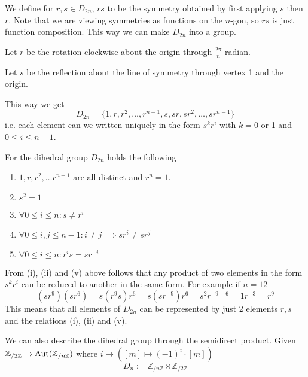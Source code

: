 \begin{center}
   
\end{center}

We define for \(r,s \in D_{2n}\), \(rs\) to be the symmetry obtained by first applying \(s\) then \(r\).
Note that we are viewing symmetries as functions on the \(n\)-gon, so \(rs\) is just function composition.
This way we can make \(D_{2n}\) into a group.

Let \(r\) be the rotation clockwise about the origin through \(\frac{2\pi}{n}\) radian.

Let \(s\) be the reflection about the line of symmetry through vertex 1 and the origin.

This way we get
\[D_{2n} = \{1, r, r^2, \ldots, r^{n-1}, s, sr, sr^2, \ldots, sr^{n-1}\}\]
i.e. each element can we written uniquely in the form \(s^kr^i\) with \(k = 0\) or 1 and \(0 \leq i \leq n-1\).
\begin{proposition}
   For the dihedral group \(D_{2n}\) holds the following
   \begin{enumerate}[label=\roman*, align=Center]
      \item \(1, r, r^2, \ldots r^{n-1}\) are all distinct and \(r^n = 1\).
      \item \(s^2 = 1\)
      \item \(\forall 0 \leq i \leq n: s \neq r^i\)
      \item \(\forall 0 \leq i,j \leq n-1: i \neq j \implies sr^i \neq sr^j\)
      \item \(\forall 0 \leq i \leq n: r^is = sr^{-i}\)
   \end{enumerate}
\end{proposition}
From (i), (ii) and (v) above follows that any product of two elements in the form \(s^kr^i\) can be reduced to another in the same form.
For example if \(n = 12\)
\[(sr^9)(sr^6) = s(r^9s)r^6 = s(sr^{-9})r^6 = s^2r^{-9+6} = 1 r^{-3} = r^9\]
This means that all elements of \(D_{2n}\) can be represented by just 2 elements \(r, s\) and the relations (i), (ii) and (v).

We can also describe the dihedral group through the semidirect product.
Given \(\mathbb{Z}_{/2\mathbb{Z}} \to \operatorname{Aut}(\mathbb{Z}_{/n\mathbb{Z}})\) where \(i \mapsto ([m] \mapsto (-1)^i \cdot [m])\)
\[D_n := \mathbb{Z}_{/n\mathbb{Z}} \rtimes \mathbb{Z}_{/2\mathbb{Z}}\]

